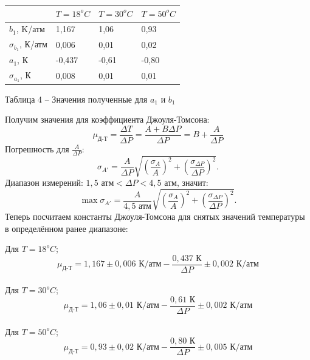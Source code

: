 \documentclass[a4paper,12pt]{article} %
\begin{document}
 \begin{table}[h]
\begin{center}
\begin{tabular}{|l||l|l|l|}
\hline 
 & $T =18^oC$ & $T = 30 ^oC$ & $T = 50 ^oC$ \\ 
\hline 
$b_1$, K/атм & 1,167 & 1,06 & 0,93 \\ 
\hline 
$\sigma_{b_1}$, К/атм & 0,006 & 0,01 & 0,02 \\ 
\hline 
$a_1$, К & -0,437 & -0,61 & -0,80 \\ 
\hline 
$\sigma_{a_1}$, К & 0,008 & 0,01 & 0,01 \\ 
\hline 
\end{tabular} 
\end{center}
\begin{center}

Таблица 4 -- Значения полученные 
для $a_1$ и $b_1$

\end{center}
\end{table}
Получим значения для коэффициента Джоуля-Томсона:
\[
\mu_\text{Д-Т} = \frac{\Delta T}{\Delta P} = \frac{A + B \Delta P}{\Delta P} = B + \frac{A}{\Delta P}
\]
Погрешность для $\frac{A}{\Delta P}$: 
\[
\sigma_{A'} = \frac{A}{\Delta P} \sqrt{\left(\frac{\sigma_A}{A}\right)^2 + \left(\frac{\sigma_{\Delta P}}{\Delta P}\right)^2}. 
\]
Диапазон измерений: $ 1,5\text{ атм} < \Delta P < 4,5 \text{ атм} $, значит:
\[
\max{\sigma_{A'}} = \frac{A}{4,5 \text{ атм}} \sqrt{\left(\frac{\sigma_A}{A}\right)^2 + \left(\frac{\sigma_{\Delta P}}{\Delta P}\right)^2}. 
\]
Теперь посчитаем константы Джоуля-Томсона для снятых значений температуры в определённом ранее диапазоне:

Для $T = 18 ^oC$;
\begin{equation*}
 \mu_\text{Д-Т} = 1,167 \pm 0,006 \text{ К/атм} - \frac{0,437 \text{ К}}{\Delta P} \pm 0,002  \text{ К/атм}
\end{equation*}
\paragraph{}
Для $T = 30 ^oC$;
\begin{equation*} 
\mu_\text{Д-Т} = 1,06 \pm 0,01 \text{ К/атм} - \frac{0,61 \text{ К}}{\Delta P} \pm 0,002  \text{ К/атм}
\end{equation*}

\paragraph{}
Для $T = 50 ^oC$;
\begin{equation*}
 \mu_\text{Д-Т} = 0,93 \pm 0,02 \text{ К/атм} - \frac{0,80 \text{ К}}{\Delta P} \pm 0,005  \text{ К/атм}
\end{equation*}
\end{document}
